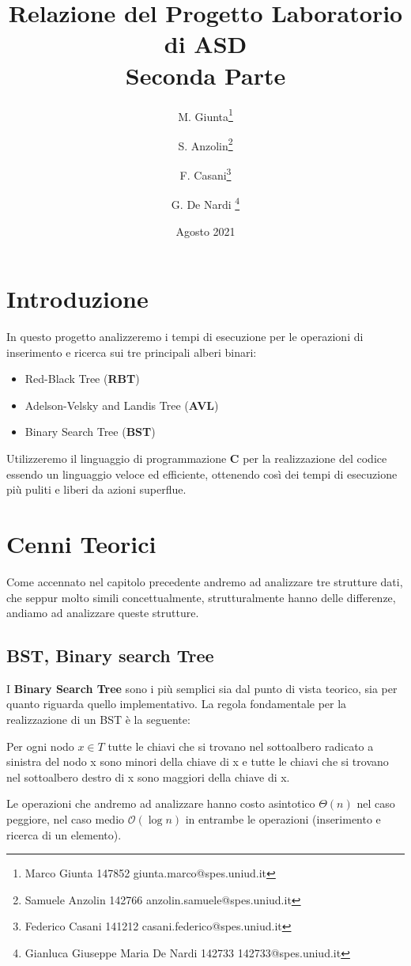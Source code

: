 \documentclass[a4paper,titlepage]{article}
\title{Relazione del Progetto Laboratorio di ASD\\[0.5em]
\large Seconda Parte}
\date{Agosto 2021}
\author{
M. Giunta\thanks{Marco Giunta 147852 giunta.marco@spes.uniud.it} \and
S. Anzolin\thanks{Samuele Anzolin 142766  anzolin.samuele@spes.uniud.it} \and
F. Casani\thanks{Federico Casani 141212  casani.federico@spes.uniud.it} \and
G. De Nardi \thanks{Gianluca Giuseppe Maria De Nardi 142733 142733@spes.uniud.it}
}
\begin{document}
\maketitle

\tableofcontents
\newpage

\section{Introduzione}
In questo progetto analizzeremo i tempi di esecuzione per le operazioni di inserimento e ricerca sui tre principali alberi binari:
\begin{itemize}
  \item Red-Black Tree (\textbf{RBT})
  \item Adelson-Velsky and Landis Tree (\textbf{AVL})
  \item Binary Search Tree (\textbf{BST})
\end{itemize}
Utilizzeremo il linguaggio di programmazione \textbf{C} per la realizzazione del codice essendo un linguaggio veloce ed efficiente, ottenendo così dei tempi di esecuzione più puliti e liberi da azioni superflue.
\newpage

\section{Cenni Teorici}
Come accennato nel capitolo precedente andremo ad analizzare tre strutture dati, che seppur molto simili concettualmente, strutturalmente hanno delle differenze, andiamo ad analizzare queste strutture.

\subsection{BST, Binary search Tree}
I \textbf{Binary Search Tree} sono i più semplici sia dal punto di vista teorico, sia per quanto riguarda quello implementativo.
La regola fondamentale per la realizzazione di un BST è la seguente:

\begin{displayquote}
Per ogni nodo \(x \in T\) tutte le chiavi che si trovano nel sottoalbero radicato a sinistra del nodo x sono minori della chiave di x e tutte le chiavi che si trovano nel sottoalbero destro di x sono maggiori della chiave di x.
\end{displayquote}

Le operazioni che andremo ad analizzare hanno costo asintotico \(\Theta(n)\) nel caso peggiore,  nel caso medio \(\mathcal{O}(\log{}n)\) in entrambe le operazioni (inserimento e ricerca di un elemento).
\end{document}
